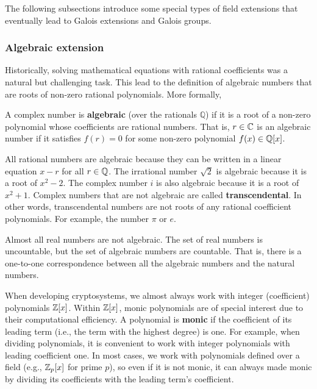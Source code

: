 \documentclass[../main.tex]{subfiles}
\begin{document}
The following subsections introduce some special types of field extensions that eventually lead to Galois extensions and Galois groups. 

\subsubsection{Algebraic extension}
Historically, solving mathematical equations with rational coefficients was a natural but challenging task. This lead to the definition of algebraic numbers that are roots of non-zero rational polynomials. More formally, 

\reversemarginpar
{}
\begin{definition}
A complex number is \textbf{algebraic} (over the rationals $\mathbb{Q}$) if it is a root of a non-zero polynomial whose coefficients are rational numbers. That is, $r \in \mathbb{C}$ is an algebraic number if it satisfies $f(r)=0$ for some non-zero polynomial $f(x) \in \mathbb{Q}[x]$.
\end{definition}

All rational numbers are algebraic because they can be written in a linear equation $x-r$ for all $r \in \mathbb{Q}$. The irrational number $\sqrt{2}$ is algebraic because it is a root of $x^2-2$. The complex number $i$ is also algebraic because it is a root of $x^2+1$. Complex numbers that are not algebraic are called \textbf{transcendental}. In other words, transcendental numbers are not roots of any rational coefficient polynomials. For example, the number $\pi$ or $e$. 

Almost all real numbers are not algebraic. The set of real numbers is uncountable, but the set of algebraic numbers are countable. That is, there is a one-to-one correspondence between all the algebraic numbers and the natural numbers. 

When developing cryptosystems, we almost always work with integer (coefficient) polynomials $\mathbb{Z}[x]$. Within $\mathbb{Z}[x]$, monic polynomials are of special interest due to their computational efficiency. A polynomial is \textbf{monic} if the coefficient of its leading term (i.e., the term with the highest degree) is one. For example, when dividing polynomials, it is convenient to work with integer polynomials with leading coefficient one. In most cases, we work with polynomials defined over a field (e.g., $\mathbb{Z}_p[x]$ for prime $p$), so even if it is not monic, it can always made monic by dividing its coefficients with the leading term's coefficient. %
\end{document}
